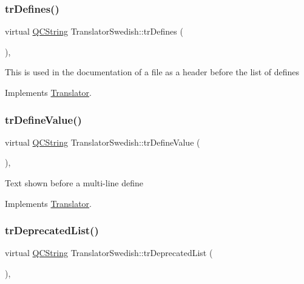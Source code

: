 \subsubsection{\texorpdfstring{trDefines()}{trDefines()}}
{\footnotesize\ttfamily virtual \mbox{\hyperlink{class_q_c_string}{Q\+C\+String}} Translator\+Swedish\+::tr\+Defines (\begin{DoxyParamCaption}{ }\end{DoxyParamCaption})\hspace{0.3cm}{\ttfamily [inline]}, {\ttfamily [virtual]}}

This is used in the documentation of a file as a header before the list of defines 

Implements \mbox{\hyperlink{class_translator}{Translator}}.

\mbox{\label{class_translator_swedish_afba3b3680477e0a1f6becb3cb5338688}} 
\subsubsection{\texorpdfstring{trDefineValue()}{trDefineValue()}}
{\footnotesize\ttfamily virtual \mbox{\hyperlink{class_q_c_string}{Q\+C\+String}} Translator\+Swedish\+::tr\+Define\+Value (\begin{DoxyParamCaption}{ }\end{DoxyParamCaption})\hspace{0.3cm}{\ttfamily [inline]}, {\ttfamily [virtual]}}

Text shown before a multi-\/line define 

Implements \mbox{\hyperlink{class_translator}{Translator}}.

\mbox{\label{class_translator_swedish_af13d2e3b94f7c78d6f6f63f84fc9d4b1}} 
\subsubsection{\texorpdfstring{trDeprecatedList()}{trDeprecatedList()}}
{\footnotesize\ttfamily virtual \mbox{\hyperlink{class_q_c_string}{Q\+C\+String}} Translator\+Swedish\+::tr\+Deprecated\+List (\begin{DoxyParamCaption}{ }\end{DoxyParamCaption})\hspace{0.3cm}{\ttfamily [inline]}, {\ttfamily [virtual]}}

